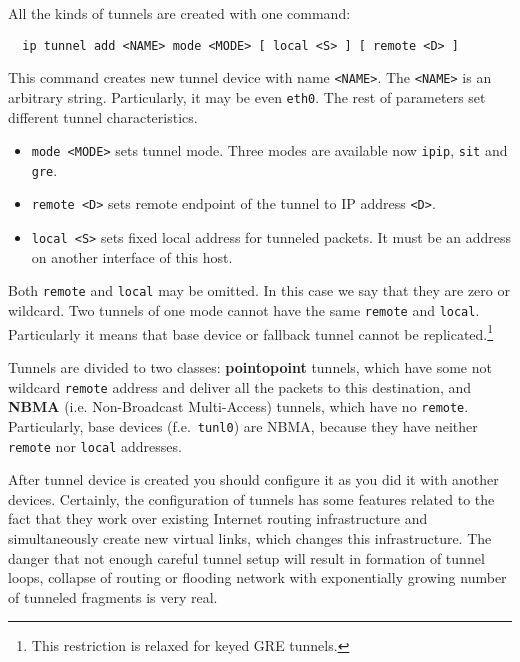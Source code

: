\vspace{2mm}

\noindent All the kinds of tunnels are created with one command:
\begin{verbatim}
  ip tunnel add <NAME> mode <MODE> [ local <S> ] [ remote <D> ]
\end{verbatim}

This command creates new tunnel device with name \verb|<NAME>|.
The \verb|<NAME>| is an arbitrary string. Particularly,
it may be even \verb|eth0|. The rest of parameters set
different tunnel characteristics.

\begin{itemize}

\item
\verb|mode <MODE>| sets tunnel mode. Three modes are available now
	\verb|ipip|, \verb|sit| and \verb|gre|.

\item
\verb|remote <D>| sets remote endpoint of the tunnel to IP
	address \verb|<D>|.
\item
\verb|local <S>| sets fixed local address for tunneled
	packets. It must be an address on another interface of this host.

\end{itemize}

\let\thefootnote\oldthefootnote

Both \verb|remote| and \verb|local| may be omitted. In this case we
say that they are zero or wildcard. Two tunnels of one mode cannot
have the same \verb|remote| and \verb|local|. Particularly it means
that base device or fallback tunnel cannot be replicated.\footnote{
This restriction is relaxed for keyed GRE tunnels.}

Tunnels are divided to two classes: {\bf pointopoint} tunnels, which
have some not wildcard \verb|remote| address and deliver all the packets
to this destination, and {\bf NBMA} (i.e. Non-Broadcast Multi-Access) tunnels,
which have no \verb|remote|. Particularly, base devices (f.e.\ \verb|tunl0|)
are NBMA, because they have neither \verb|remote| nor
\verb|local| addresses.


After tunnel device is created you should configure it as you did
it with another devices. Certainly, the configuration of tunnels has
some features related to the fact that they work over existing Internet
routing infrastructure and simultaneously create new virtual links,
which changes this infrastructure. The danger that not enough careful
tunnel setup will result in formation of tunnel loops,
collapse of routing or flooding network with exponentially
growing number of tunneled fragments is very real.


